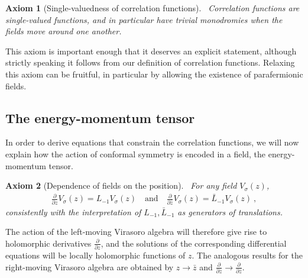 \documentclass[12pt, a4paper, notitlepage, twoside]{report}
\numberwithin{equation}{section}
\theoremstyle{break}
\newtheorem{hyp}{Axiom}[chapter]
\begin{document}
\begin{hyp}[Single-valuedness of correlation functions]
 ~\label{ax:svcf}
 Correlation functions are single-valued functions, and in particular have trivial monodromies when the fields move around one another.
\end{hyp}
\noindent
This axiom is important enough that it deserves an explicit statement, although strictly speaking it follows from our definition of correlation functions.
Relaxing this axiom can be fruitful, in particular by allowing the existence of parafermionic fields.


\subsection{The energy-momentum tensor \label{secem}}

In order to derive equations that constrain the correlation functions, we will now explain how the action of conformal symmetry is encoded in a field, the energy-momentum tensor.

\begin{hyp}[Dependence of fields on the position]
 ~\label{ax:dvz}
 For any field $V_\sigma(z)$,
 \begin{align}
 \boxed{{\frac{\partial}{\partial z} V_\sigma(z)} = L_{-1} V_\sigma (z) }  \quad \text{and} \quad {\frac{\partial}{\partial \bar z} V_\sigma(z)} = \bar L_{-1} V_\sigma (z)\ ,
\label{lvpv}
\end{align}
consistently with the interpretation of $L_{-1},\bar L_{-1}$ as generators of translations. 
\end{hyp}
\noindent
The action of the left-moving Virasoro algebra will therefore give rise to holomorphic derivatives $\frac{\partial}{\partial z}$, and the solutions of the corresponding differential equations will be locally holomorphic functions of $z$. The analogous results for the right-moving Virasoro algebra are obtained by $z\to \bar z$ and $\frac{\partial}{\partial z} \to \frac{\partial}{\partial \bar z}$. 
\end{document}
